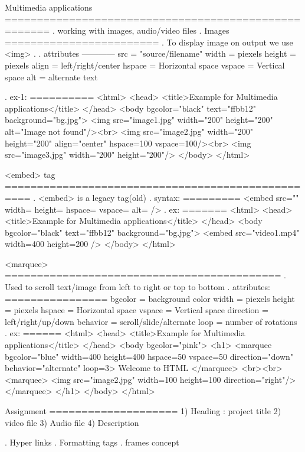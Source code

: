 Multimedia applications
=====================================================
. working with images, audio/video files
. Images
========================
. To display image on output we use <img> .
. attributes
 ------------
  src = "source/filename"
  width = piexels
  height = piexels
  align = left/right/center
  hspace = Horizontal space
  vspace = Vertical space
  alt = alternate text

. ex-1:
==========
<html>
   <head>
     <title>Example for Multimedia applications</title>
   </head>
   <body bgcolor="black" text="ffbb12" background="bg.jpg">
    <img src="image1.jpg" width="200" height="200" alt="Image not found"/><br>
    <img src="image2.jpg" width="200" height="200" align="center" hspace=100 vspace=100/><br>
    <img src="image3.jpg" width="200" height="200"/>
   </body>
</html>

<embed> tag
==================================================
. <embed> is a legacy tag(old)
. syntax:
========= 
  <embed src="" width= height= hspace= vspace= alt= />
. ex:
=======
<html>
   <head>
     <title>Example for Multimedia applications</title>
   </head>
   <body bgcolor="black" text="ffbb12" background="bg.jpg">
    <embed src="video1.mp4"  width=400 height=200 />
   </body>
</html>

<marquee>
===========================================
. Used to scroll text/image from left to right or top to bottom
. attributes:
================
  bgcolor = background color
  width   = piexels
  height  = piexels
  hspace  = Horizontal space
  vspace  = Vertical space
  direction = left/right/up/down
  behavior = scroll/slide/alternate
  loop = number of rotations
. ex:
======
<html>
   <head>
     <title>Example for Multimedia applications</title>
   </head>
   <body bgcolor="pink">
   <h1>
   <marquee bgcolor="blue" width=400 height=400 hspace=50 vspace=50 direction="down" behavior="alternate" loop=3>
     Welcome to HTML
   </marquee>
   <br><br>
   <marquee>
     <img src="image2.jpg" width=100 height=100 direction="right"/>
   </marquee>
   </h1>
   </body>
</html>

Assignment
====================
1) Heading : project title
2) video file
3) Audio file
4) Description 

. Hyper links
. Formatting tags
. frames concept